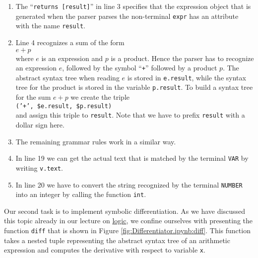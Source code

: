 \begin{enumerate}
\item The  ``\texttt{returns [result]}'' in line 3 specifies
      that the expression object that is generated when the parser parses the non-terminal \texttt{expr}
      has an attribute with the name \texttt{result}.  
\item Line 4 recognizes a sum of the form
      \\[0.2cm]
      \hspace*{1.3cm}
      $e + p$
      \\[0.2cm]
      where $e$ is an expression and $p$ is a product.
      Hence the parser has to recognize an expression $e$, followed by the symbol ``\texttt{+}'' followed by a
      product $p$.  The abstract syntax tree when reading $e$ is stored in 
      \texttt{e.result}, while the syntax tree for the product is stored in the variable
      \texttt{p.result}.  To build a syntax tree for the sum $e + p$ we create the triple
      \\[0.2cm]
      \hspace*{1.3cm}
      \texttt{('+', \$e.result, \$p.result)}
      \\[0.2cm]
      and assign this triple to \texttt{result}.  Note that we have to prefix
      \texttt{result} with a dollar sign here.
\item The remaining grammar rules work in a similar way.
\item In line 19 we can get the actual text that is matched by the terminal \texttt{VAR} by writing 
      \texttt{v.text}.
\item In line 20 we have to convert the string recognized by the terminal \texttt{NUMBER} into an integer
      by calling the function \texttt{int}.
\end{enumerate}

Our second task is to implement symbolic differentiation.  As we have discussed this topic already in 
our lecture on \href{https://github.com/karlstroetmann/Logic/blob/master/Lecture-Notes/logic.pdf}{logic},
we confine ourselves with presenting the function \texttt{diff} that is shown in Figure
\ref{fig:Differentiator.ipynb:diff}.  This function takes a nested tuple representing the abstract syntax tree 
of an arithmetic expression and computes the derivative with respect to variable \texttt{x}.

